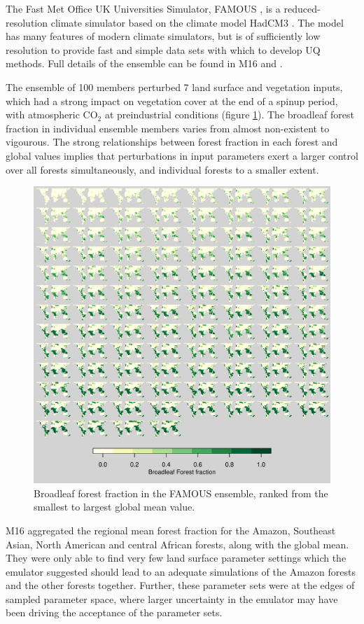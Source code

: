 \documentclass[gmd, manuscript]{copernicus}
\begin{document}
The Fast Met Office UK Universities Simulator, FAMOUS \citep{jones2005systematic, smith2008famous}, is a reduced-resolution climate simulator based on the climate model HadCM3 \citep{gordon2000simulation, pope2000impact}. The model has many features of modern climate simulators, but is of sufficiently low resolution to provide fast and simple data sets with which to develop UQ methods. Full details of the ensemble can be found in M16 and \cite{williams2013optimising}.

The ensemble of 100 members perturbed 7 land surface and vegetation inputs, which had a strong impact on vegetation cover at the end of a spinup period, with atmospheric CO$_2$ at preindustrial conditions (figure \ref{fig:tropics_maps_yg}). The broadleaf forest fraction in individual ensemble members varies from almost non-existent to vigourous. The strong relationships between forest fraction in each forest and global values implies that perturbations in input parameters exert a larger control over all forests simultaneously, and individual forests to a smaller extent.

\begin{figure}[t]
\includegraphics[width=12cm]{../graphics/tropics_maps_yg.pdf}
\caption{Broadleaf forest fraction in the FAMOUS ensemble, ranked from the smallest to largest global mean value.}
\label{fig:tropics_maps_yg}
\end{figure}


M16 aggregated the regional mean forest fraction for the Amazon, Southeast Asian, North American and central African forests, along with the global mean. They were only able to find very few land surface parameter settings which the emulator suggested should lead to an adequate simulations of the Amazon forests and the other forests together. Further, these parameter sets were at the edges of sampled parameter space, where larger uncertainty in the emulator may have been driving the acceptance of the parameter sets. 
\end{document}
